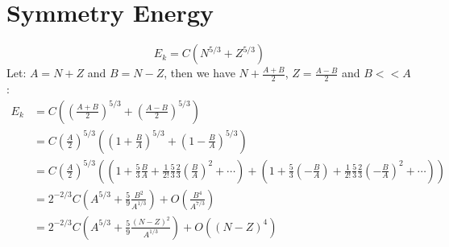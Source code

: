 \chapter{Symmetry Energy}
\label{ap:symmetry_energy}
$$ E_k = C(N^{5/3} + Z^{5/3}) $$
Let: $A = N + Z$ and $B = N - Z$, then we have $N + \frac{A+B}{2}$, 
$Z = \frac{A-B}{2}$ and $B << A$:
\begin{equation*}
    \begin{aligned}
	E_k &= C\left( \left( \frac{A+B}{2}\right)^{5/3} + \left(\frac{A-B}{2} \right)^{5/3} \right)	\\
	    &= C\left(\frac{A}{2}\right)^{5/3} \left( \left( 1 + \frac{B}{A} \right)^{5/3} + \left(1 - \frac{B}{A} \right)^{5/3} \right)   \\
	    &= C\left(\frac{A}{2}\right)^{5/3} \left( \left(1 + \frac{5}{3}\frac{B}{A} + \frac{1}{2!}\frac{5}{3}\frac{2}{3} \left( \frac{B}{A} \right)^2 + \cdots \right) 
		+ \left(1 + \frac{5}{3}\left(-\frac{B}{A} \right) + \frac{1}{2!}\frac{5}{3}\frac{2}{3} \left( -\frac{B}{A} \right)^2 + \cdots \right) \right) \\
	    &= 2^{-2/3}C\left( A^{5/3} + \frac{5}{9}\frac{B^2}{A^{1/3}} \right) + O(\frac{B^4}{A^{7/3}})	\\
	    &= 2^{-2/3}C\left( A^{5/3} + \frac{5}{9}\frac{(N-Z)^2}{A^{1/3}} \right) + O((N-Z)^4)	\\
    \end{aligned}
\end{equation*}

